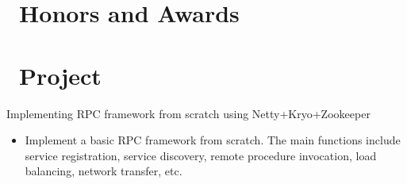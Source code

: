 \documentclass{resume}
\begin{document}
\section{\faHeartO\ Honors and Awards}

\section{\faInfo\ Project}
   Implementing RPC framework from scratch using Netty+Kryo+Zookeeper
\begin{itemize}[parsep=0.5ex]
  \item Implement a basic RPC framework from scratch. The main functions include service registration, service discovery, remote procedure invocation, load balancing, network transfer, etc.
\end{itemize}

%
%
\end{document}
